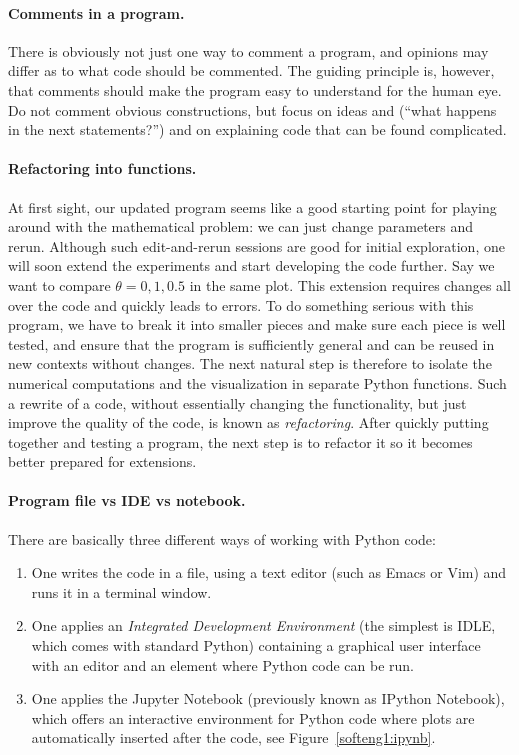 \documentclass[graybox,sectrefs,envcountresetchap,open=right,final]{svmonodo}
\begin{document}
\paragraph{Comments in a program.}
There is obviously not just one way to comment a program, and opinions
may differ as to what code should be commented.
The guiding principle is, however, that comments should make the
program easy to understand for the human eye. Do not comment obvious
constructions, but focus on ideas and (``what happens in the next
statements?'') and on explaining code that can be found
complicated.



\paragraph{Refactoring into functions.}
At first sight, our updated program seems like
a good starting point for playing around
with the mathematical problem: we can just change parameters and rerun.
Although such edit-and-rerun sessions are good for initial exploration,
one will soon extend the experiments and start developing the code
further. Say we want to compare $\theta =0,1,0.5$ in the same
plot. This extension requires changes all over the code and quickly
leads to errors. To do something serious with this program, we have to
break it into smaller pieces and make sure each piece is well tested,
and ensure that the program is sufficiently general and can be reused in
new contexts without changes.  The
next natural step is therefore to isolate the numerical computations
and the visualization in separate Python functions.
Such a rewrite of a code, without essentially changing the functionality,
but just improve the quality of the code, is known as \emph{refactoring}.
After quickly putting together and testing a program, the next
step is to refactor it so it becomes better prepared for extensions.

\paragraph{Program file vs IDE vs notebook.}
There are basically three different ways of working with Python code:

\begin{enumerate}
\item One writes the code in a file, using a text editor (such as
   Emacs or Vim) and runs it in a terminal window.

\item One applies an \emph{Integrated Development Environment} (the simplest is IDLE, which comes with standard Python) containing a graphical user interface with an editor and an element where Python code can be run.

\item One applies the Jupyter Notebook (previously known as IPython Notebook),
   which offers an interactive environment for Python code where
   plots are automatically inserted after the code, see Figure~\ref{softeng1:ipynb}.
\end{enumerate}
\end{document}
